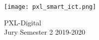 \begin{figure}[!h]
  \centering
  \texttt{[image: pxl\_smart\_ict.png]}
  \caption{PXL-Digital\\
  Jury Semester 2 2019-2020}
\end{figure}